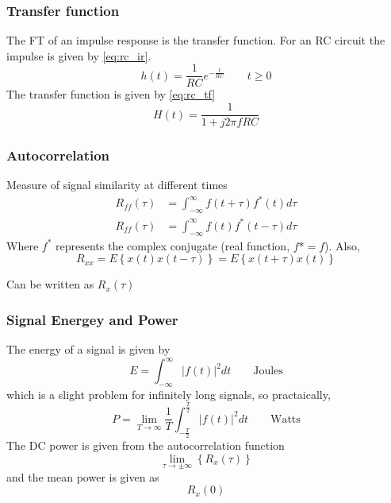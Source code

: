 \documentclass[a4paper,twocolumn]{article}
\newcommand{\infint}{ \int_{-\infty}^{\infty}}
\begin{document}
			\subsubsection{Transfer function}
				The FT of an impulse response is the transfer function.
				For an RC circuit the impulse  is given by \cref{eq:rc_ir}.
				\begin{equation}
					h(t) = \frac{1}{RC}e^{-\frac{t}{RC}} \qquad t\ge 0 \label{eq:rc_ir}
				\end{equation}
				The transfer function is given by \cref{eq:rc_tf}
				\begin{equation}
					H(t) = \frac{1}{1+j2\pi f RC}\label{eq:rc_tf}
				\end{equation}
			\subsubsection{Autocorrelation}
				Measure of signal similarity at different times
				\begin{align}
					R_{ff}(\tau) &= \infint f(t+\tau)f^\ast(t) d\tau \\
					R_{ff}(\tau) &= \infint f(t)f^\ast(t-\tau) d\tau
				\end{align}
				Where $f^\ast$ represents the complex conjugate (real function, $f\ast = f$).
				Also,
				\begin{equation}
					R_{xx} = E \left\{ x(t)x(t-\tau) \right\}=E \left\{x(t+\tau)x(t)\right\}
				\end{equation}

				Can be written as $R_x(\tau)$
			\subsubsection{Signal Energey and Power}
				The energy of a signal is given by
				\begin{equation}
					E = \infint \left| f(t)\right|^2 dt \qquad \mathrm{Joules}
				\end{equation}
				which is a slight problem for infinitely long signals, so practaically,
				\begin{equation}
					P =\lim_{T \to \infty} \frac{1}{T} \int^{\frac{T}{2}}_{-\frac{T}{2}} 
					\left| f(t)\right|^2 dt \qquad \mathrm{Watts}
				\end{equation}
				The DC power is given from the autocorrelation function
				\begin{equation}
					\lim_{\tau \to \pm\infty}\left\{ R_{x}(\tau) \right\}
				\end{equation}
				and the mean power is given as
				\[R_x(0)\]
\end{document}
